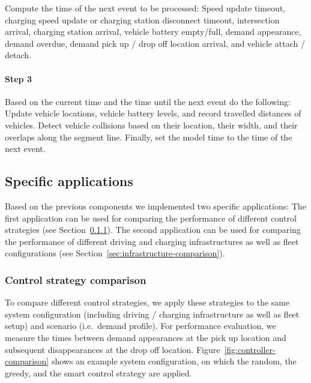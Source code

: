 \documentclass[a4paper,twoside]{article}
\begin{document}
	Compute the time of the next event to be processed:
	Speed update timeout,
	charging speed update or charging station disconnect timeout,
	intersection arrival,
	charging station arrival,
	vehicle battery empty/full,
	demand appearance,
	demand overdue,
	demand pick up / drop off location arrival, and
	vehicle attach / detach.
	
	\paragraph{Step 3}
	
	Based on the current time and the time until the next event do the following:
	Update vehicle locations, vehicle battery levels, and record travelled distances of vehicles.
	Detect vehicle collisions based on their location, their width, and their overlaps along the segment line.
	Finally, set the model time to the time of the next event.
	
	\subsection{Specific applications}
	\label{sec:application}
	
	Based on the previous components we implemented two specific applications:
	The first application can be used for comparing the performance of different control strategies (see Section~\ref{sec:controller-comparison}).
	The second application can be used for comparing the performance of different driving and charging infrastructures as well as fleet configurations (see Section~\ref{sec:infrastructure-comparison}).

%
	
	\subsubsection{Control strategy comparison}
	\label{sec:controller-comparison}
	
	To compare different control strategies, we apply these strategies to the same system configuration (including driving / charging infrastructure as well as fleet setup) and scenario (i.e.\ demand profile).
	For performance evaluation, we measure the times between demand appearances at the pick up location and subsequent disappearances at the drop off location.
	Figure~\ref{fig:controller-comparison} shows an example system configuration, on which the random, the greedy, and the smart control strategy are applied.
	
\end{document}
